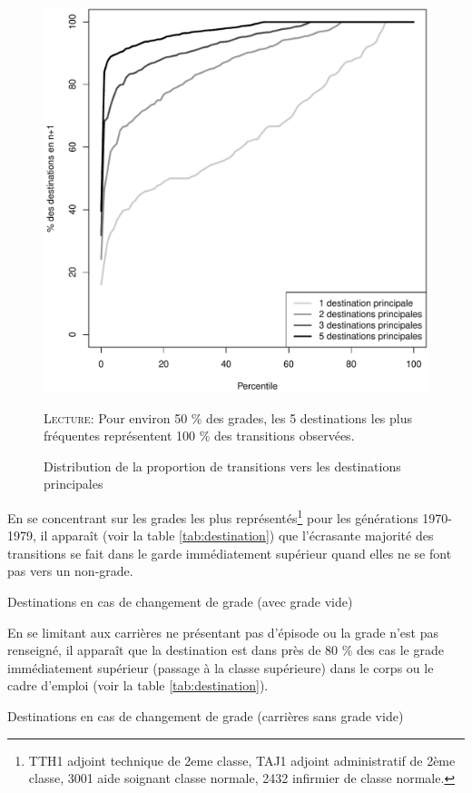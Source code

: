 \documentclass[11pt,a4paper]{article}
\begin{document}
\begin{figure}[h!]
  \label{pct}
\caption{Distribution de la proportion de transitions vers les destinations principales}
\vspace{-0.1cm}
\centering
 \includegraphics[width=0.5\linewidth]{pct.pdf}
\vspace{0.1cm}  
\begin{minipage}{12cm}%
\small \textsc{Lecture:} Pour environ 50 \% des grades, les 5 destinations les plus fréquentes représentent 100 \% des transitions observées.  
 \end{minipage}%
\end{figure}

En se concentrant sur les grades les plus représentés\footnote{TTH1 adjoint technique de 2eme classe, TAJ1 adjoint administratif de 2ème classe, 3001 aide soignant classe normale, 2432 infirmier de classe normale.}
pour les générations 1970-1979, il apparaît (voir la table \ref{tab:destination}) que l'écrasante majorité des transitions se fait dans le garde immédiatement supérieur quand elles ne se font pas vers un non-grade.
\begin{table}[h!]
    \label{tab:destination}
    \centering
    \caption{Destinations en cas de changement de grade (avec grade vide)} 
    
\end{table}

En se limitant aux carrières ne présentant pas d'épisode ou la grade n'est pas renseigné, il apparaît que la destination est dans près de 80 \% des cas le grade immédiatement supérieur (passage à la classe supérieure) dans le corps ou le cadre d'emploi (voir la table \ref{tab:destination}).       

\begin{table}[h!]
    \label{tab:purged_destination}
    \centering
    \caption{Destinations en cas de changement de grade (carrières sans grade vide)} 
    
\end{table}
\end{document}
